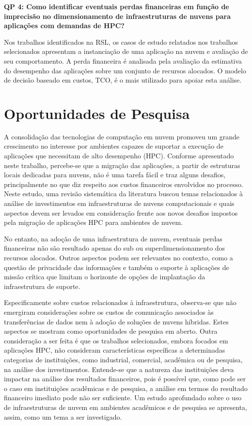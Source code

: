 \documentclass[tese,capa]{texufpel}
\begin{document}
\textbf{QP 4: Como identificar eventuais perdas financeiras em função de imprecisão no dimensionamento de infraestruturas de nuvens para aplicações com demandas de HPC?}

Nos trabalhos identificados na RSL, os casos de estudo relatados nos trabalhos selecionados apresentam a instanciação de uma aplicação na nuvem e avaliação de seu comportamento. A perda financeira é analisada pela avaliação da estimativa do desempenho das aplicações sobre um conjunto de recursos alocados. O modelo de decisão baseado em custos, TCO, é o mais utilizado para apoiar esta análise.

\section{Oportunidades de Pesquisa}\label{sec:oportunidades}

A consolidação das tecnologias de computação em nuvem promoveu um grande crescimento no interesse por ambientes capazes de suportar a execução de aplicações que necessitam de alto desempenho (HPC). Conforme apresentado neste trabalho, percebe-se que a migração das aplicações, a partir de estruturas locais dedicadas para nuvens, não é uma tarefa fácil e traz alguns desafios, principalmente no que diz respeito aos custos financeiros envolvidos no processo. Neste estudo, uma revisão sistemática da literatura buscou temas relacionados à análise de investimentos em infraestruturas de nuvens computacionais e quais aspectos devem ser levados em consideração frente aos novos desafios impostos pela migração de aplicações HPC para ambientes de nuvem.

No entanto, na adoção de uma infraestrutura de nuvem, eventuais perdas financeiras não são resultado apenas do sub ou superdimensionamento dos recursos alocados. Outros aspectos podem ser relevantes no contexto, como a questão de privacidade das informações \cite{ramgovind_management_2010,Bhavani2017InvestigationOS} e também o suporte à aplicações de missão crítica \cite{lamboglia_hosting_2018} que limitam o horizonte de opções de implantação da infraestrutura de suporte.

Especificamente sobre custos relacionados à infraestrutura, observa-se que não emergiram considerações sobre os custos de comunicação associados às transferências de dados nem à adoção de soluções de nuvens híbridas. Estes aspectos se mostram como oportunidades de pesquisa em aberto. Outra consideração a ser feita é que os trabalhos selecionados, embora focados em aplicações HPC, não consideram características específicas a determinadas categorias de instituições, como industrial, comercial, acadêmica ou de pesquisa, na análise dos investimentos. Entende-se que a natureza das instituições deva impactar na análise dos resultados financeiros, pois é possível que, como 
pode ser o caso em instituições acadêmicas e de pesquisa, a análise em termos do resultado financeiro imediato pode não ser suficiente. Um estudo aprofundado sobre o uso de infraestruturas de nuvem em ambientes acadêmicos e de pesquisa se apresenta, assim, como um tema a ser investigado.
\end{document}
